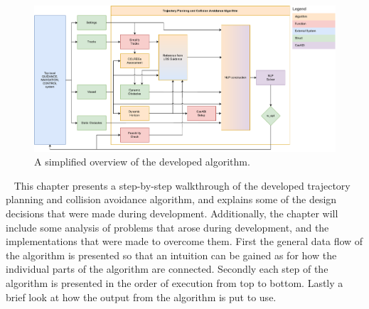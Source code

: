 


\begin{figure}[ht!]
    \includegraphics[width=\textwidth]{Images/SimpleSystem.pdf}
    \caption{A simplified overview of the developed algorithm.}
    \label{FIG: Dataflow chart}
\end{figure}
 \newline
This chapter presents a step-by-step walkthrough of the developed trajectory planning and collision avoidance algorithm, and explains some of the
design decisions that were made during development. Additionally, the chapter will include some analysis of problems that arose during development,
and the implementations that were made to overcome them. First the general data flow of the algorithm is presented so that an intuition
can be gained as for how the individual parts of the algorithm are connected. Secondly each step of the algorithm is presented in the order of execution
from top to bottom. Lastly a brief look at how the output from the algorithm is put to use. 

